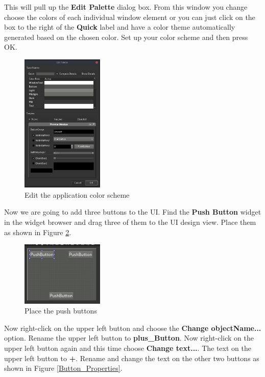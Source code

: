 \documentclass{article}
\begin{document}
This will pull up the \textbf{Edit Palette} dialog box. From this window you change choose the colors of each individual window element or you can just click on the box to the right of the \textbf{Quick} label and have a color theme automatically generated based on the chosen color. Set up your color scheme and then press OK.

	\begin{figure}[H]
		\centering
		\includegraphics[width=0.35\textwidth]{pics/Edit_Palette.png}
		\caption{Edit the application color scheme}
		\label{Edit_Palette}
	\end{figure}

Now we are going to add three buttons to the UI. Find the \textbf{Push Button} widget in the widget browser and drag three of them to the UI design view. Place them as shown in Figure \ref{Place_Buttons}.

	\begin{figure}[H]
		\centering
		\includegraphics[width=0.35\textwidth]{pics/Place_Push_Buttons.png}
		\caption{Place the push buttons}
		\label{Place_Buttons}
	\end{figure}

Now right-click on the upper left button and choose the \textbf{Change objectName...} option. Rename the upper left button to \textbf{plus\_Button}. Now right-click on the upper left button again and this time choose \textbf{Change text...}. The text on the upper left button to \textbf{+}. Rename and change the text on the other two buttons as shown in Figure \ref{Button_Properties}.
\end{document}
